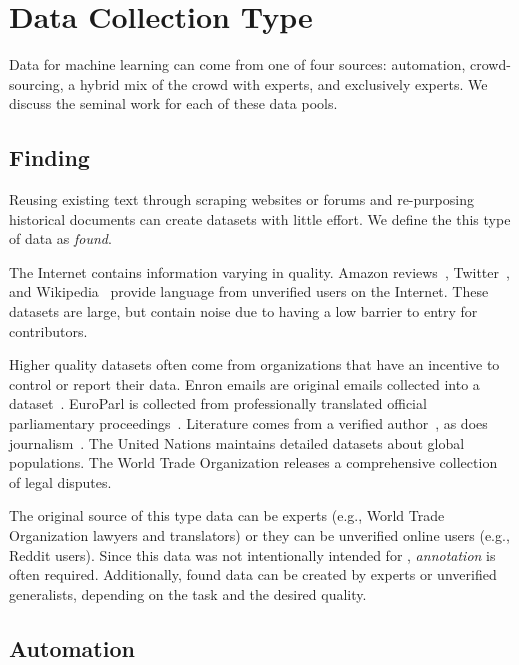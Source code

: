 \section{Data Collection Type}
\label{sec:bgdata}

Data for machine learning can come from one of four sources: automation, crowd-sourcing, a hybrid mix of the crowd with experts, and exclusively experts.  
%
We discuss the seminal work for each of these data pools.

\subsection{Finding}
\label{sec:found}

Reusing existing text through scraping websites or forums and re-purposing historical documents can create datasets with little effort.  
%
We define the this type of data as \textit{found}.  

The Internet contains information varying in quality.  
%
Amazon reviews~\citep{mcauley2015image}, Twitter~\citep{banda2020twitter}, and Wikipedia~\citep{vrandevcic2014wikidata} provide language from unverified users on the Internet.  
%
These datasets are large, but contain noise due to having a low barrier to entry for contributors.  

Higher quality datasets often come from organizations that have an incentive to control or report their data.
%
Enron emails are original emails collected into a dataset~\citep{klimt2004enron}.
%
EuroParl is collected from professionally translated official parliamentary proceedings~\citep{koehn2005europarl}.
%
Literature comes from a verified author~\citep{iyyer2016feuding}, as does journalism~\citep{lewis2004rcv1}.
%
%
The United Nations maintains detailed datasets about global populations.  
%
%
The World Trade Organization releases a comprehensive collection of legal disputes.  
%

The original source of this type data can be experts (e.g., World Trade Organization lawyers and translators) or they can be unverified online users (e.g., Reddit users).
%
Since this data was not intentionally intended for \nlp{}, \textit{annotation} is often required.  
%
Additionally, found data can be created by experts or unverified generalists, depending on the task and the desired quality.  

\subsection{Automation}

